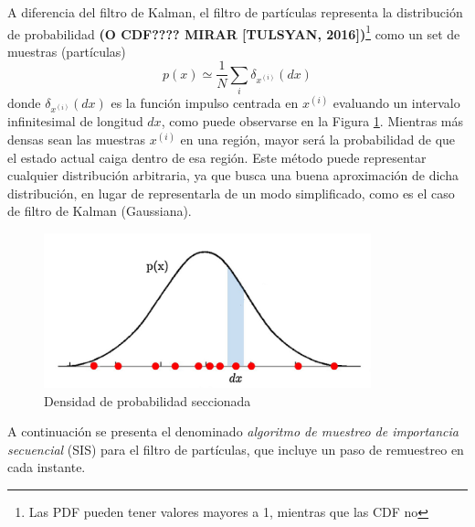 A diferencia del filtro de Kalman, el filtro de partículas representa la distribución de probabilidad \textbf{(O CDF???? MIRAR [TULSYAN, 2016])}\footnote{Las PDF pueden tener valores mayores a 1, mientras que las CDF no} como un set de muestras (partículas)
\begin{equation}
    p(x) \simeq \frac{1}{N} \sum_i \delta_{x^{(i)}}(dx)
\end{equation}
donde $\delta_{x^{(i)}}(dx)$ es la función impulso centrada en $x^{(i)}$ evaluando un intervalo infinitesimal de longitud $dx$, como puede observarse en la Figura \ref{fig:probabilityinfinitesimal}. Mientras más densas sean las muestras $x^{(i)}$ en una región, mayor será la probabilidad de que el estado actual caiga dentro de esa región. Este método puede representar cualquier distribución arbitraria, ya que busca una buena aproximación de dicha distribución, en lugar de representarla de un modo simplificado, como es el caso de filtro de Kalman (Gaussiana).
\begin{figure}
    \centering
    \includegraphics{Img/ProbabilityInfinitesimal.png}
    \caption{Densidad de probabilidad seccionada}
    \label{fig:probabilityinfinitesimal}
\end{figure}{}

A continuación se presenta el denominado \textit{algoritmo de muestreo de importancia secuencial} (SIS) para el filtro de partículas, que incluye un paso de remuestreo en cada instante. 

